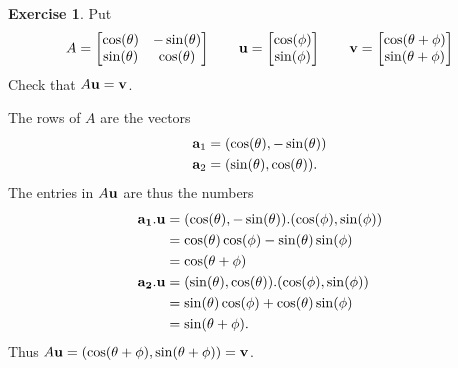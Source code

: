 \documentclass[a4paper]{book}
\theoremstyle{definition}
\newtheorem{exercise}[theorem]{Exercise}
\renewenvironment{solution}{\SolutionInline}{\endSolutionInline}
\begin{document}
\begin{exercise}
 Put
 \[
  A = \begin{bmatrix}
       \cos(\theta) & -\sin(\theta) \\
       \sin(\theta) & \cos(\theta) 
      \end{bmatrix}
  \qquad
  \mathbf{u} =
   \begin{bmatrix} \cos(\phi) \\ \sin(\phi) \end{bmatrix}
  \qquad
  \mathbf{v} =
   \begin{bmatrix} \cos(\theta+\phi) \\ \sin(\theta+\phi) \end{bmatrix}
 \]
 Check that $A\mathbf{u}=\mathbf{v}$.
\end{exercise}
\begin{solution}
 The rows of $A$ are the vectors 
 \begin{align*}
  \mathbf{a}_1 &= (\cos(\theta),-\sin(\theta)) \\
  \mathbf{a}_2 &= (\sin(\theta),\cos(\theta)).
 \end{align*}
 The entries in $A\mathbf{u}$ are thus the numbers
 \begin{align*}
  \mathbf{a_1}.\mathbf{u}
   &= (\cos(\theta),-\sin(\theta)).(\cos(\phi),\sin(\phi)) \\
   &= \cos(\theta)\cos(\phi) - \sin(\theta)\sin(\phi) \\ 
   &= \cos(\theta+\phi) \\
  \mathbf{a_2}.\mathbf{u}
   &= (\sin(\theta),\cos(\theta)).(\cos(\phi),\sin(\phi)) \\
   &= \sin(\theta)\cos(\phi) + \cos(\theta)\sin(\phi) \\ 
   &= \sin(\theta+\phi).
 \end{align*}
 Thus $A\mathbf{u}=(\cos(\theta+\phi),\sin(\theta+\phi))=\mathbf{v}$.
\end{solution}
\end{document}
